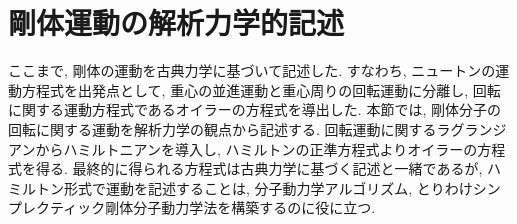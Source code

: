 

\section{剛体運動の解析力学的記述}

ここまで, 剛体の運動を古典力学に基づいて記述した.
すなわち, ニュートンの運動方程式を出発点として, 重心の並進運動と重心周りの回転運動に分離し,
回転に関する運動方程式であるオイラーの方程式を導出した.
本節では, 剛体分子の回転に関する運動を解析力学の観点から記述する.
回転運動に関するラグランジアンからハミルトニアンを導入し, ハミルトンの正準方程式よりオイラーの方程式を得る.
最終的に得られる方程式は古典力学に基づく記述と一緒であるが, ハミルトン形式で運動を記述することは, 分子動力学アルゴリズム, とりわけシンプレクティック剛体分子動力学法を構築するのに役に立つ.

